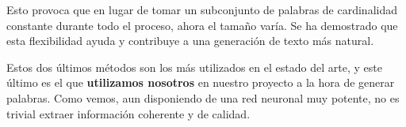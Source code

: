 Esto provoca que en lugar de tomar un subconjunto de palabras de cardinalidad constante durante todo el proceso, ahora el tamaño varía. Se ha demostrado que esta flexibilidad ayuda y contribuye a una generación de texto más natural.

Estos dos últimos métodos son los más utilizados en el estado del arte, y este último es el que \textbf{utilizamos nosotros} en nuestro proyecto a la hora de generar palabras. Como vemos, aun disponiendo de una red neuronal muy potente, no es trivial extraer información coherente y de calidad.